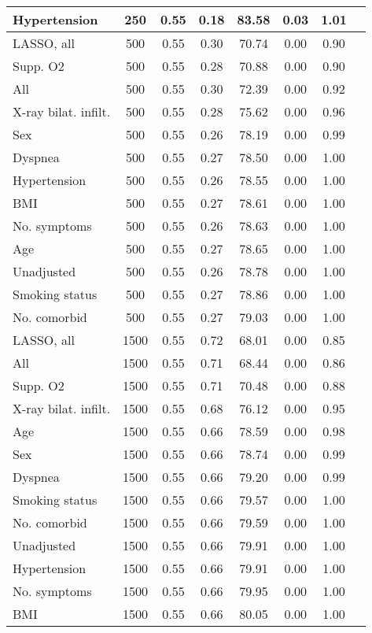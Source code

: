 \documentclass{article}
\begin{document}
{\begin{longtable}{lccccccc}
Hypertension & 250 & 0.55 & 0.18 & 83.58 & 0.03 & 1.01 \\ \midrule 
LASSO, all & 500 & 0.55 & 0.30 & 70.74 & 0.00 & 0.90 \\ 
Supp. O2 & 500 & 0.55 & 0.28 & 70.88 & 0.00 & 0.90 \\ 
All & 500 & 0.55 & 0.30 & 72.39 & 0.00 & 0.92 \\ 
X-ray bilat. infilt. & 500 & 0.55 & 0.28 & 75.62 & 0.00 & 0.96 \\ 
Sex & 500 & 0.55 & 0.26 & 78.19 & 0.00 & 0.99 \\ 
Dyspnea & 500 & 0.55 & 0.27 & 78.50 & 0.00 & 1.00 \\ 
Hypertension & 500 & 0.55 & 0.26 & 78.55 & 0.00 & 1.00 \\ 
BMI & 500 & 0.55 & 0.27 & 78.61 & 0.00 & 1.00 \\ 
No. symptoms & 500 & 0.55 & 0.26 & 78.63 & 0.00 & 1.00 \\ 
Age & 500 & 0.55 & 0.27 & 78.65 & 0.00 & 1.00 \\ 
Unadjusted & 500 & 0.55 & 0.26 & 78.78 & 0.00 & 1.00 \\ 
Smoking status & 500 & 0.55 & 0.27 & 78.86 & 0.00 & 1.00 \\ 
No. comorbid & 500 & 0.55 & 0.27 & 79.03 & 0.00 & 1.00 \\ \midrule 
LASSO, all & 1500 & 0.55 & 0.72 & 68.01 & 0.00 & 0.85 \\ 
All & 1500 & 0.55 & 0.71 & 68.44 & 0.00 & 0.86 \\ 
Supp. O2 & 1500 & 0.55 & 0.71 & 70.48 & 0.00 & 0.88 \\ 
X-ray bilat. infilt. & 1500 & 0.55 & 0.68 & 76.12 & 0.00 & 0.95 \\ 
Age & 1500 & 0.55 & 0.66 & 78.59 & 0.00 & 0.98 \\ 
Sex & 1500 & 0.55 & 0.66 & 78.74 & 0.00 & 0.99 \\ 
Dyspnea & 1500 & 0.55 & 0.66 & 79.20 & 0.00 & 0.99 \\ 
Smoking status & 1500 & 0.55 & 0.66 & 79.57 & 0.00 & 1.00 \\ 
No. comorbid & 1500 & 0.55 & 0.66 & 79.59 & 0.00 & 1.00 \\ 
Unadjusted & 1500 & 0.55 & 0.66 & 79.91 & 0.00 & 1.00 \\ 
Hypertension & 1500 & 0.55 & 0.66 & 79.91 & 0.00 & 1.00 \\ 
No. symptoms & 1500 & 0.55 & 0.66 & 79.95 & 0.00 & 1.00 \\ 
BMI & 1500 & 0.55 & 0.66 & 80.05 & 0.00 & 1.00 \\
\bottomrule
\hline
\end{longtable}
}
\end{document}
